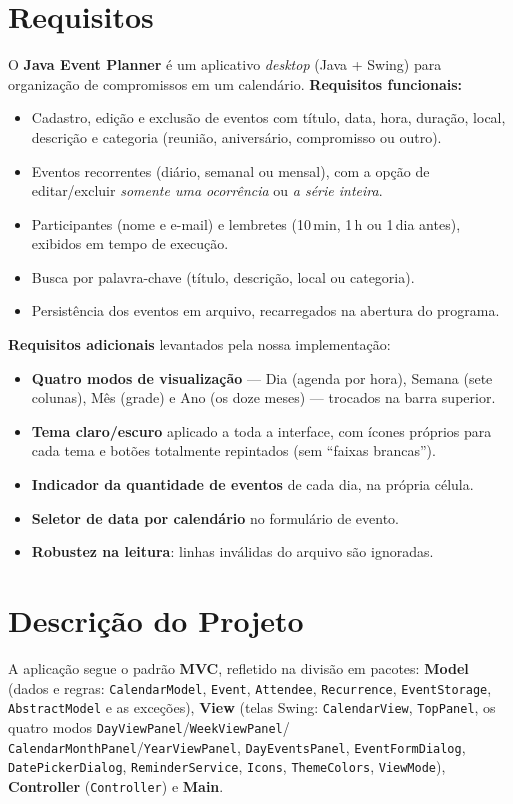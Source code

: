 \documentclass[10pt,a4paper]{article}
\begin{document}
\section{Requisitos}
O \textbf{Java Event Planner} é um aplicativo \emph{desktop} (Java + Swing) para
organização de compromissos em um calendário. \textbf{Requisitos funcionais:}
\begin{itemize}
  \item Cadastro, edição e exclusão de eventos com título, data, hora, duração,
        local, descrição e categoria (reunião, aniversário, compromisso ou outro).
  \item Eventos recorrentes (diário, semanal ou mensal), com a opção de
        editar/excluir \emph{somente uma ocorrência} ou \emph{a série inteira}.
  \item Participantes (nome e e-mail) e lembretes (10\,min, 1\,h ou 1\,dia antes),
        exibidos em tempo de execução.
  \item Busca por palavra-chave (título, descrição, local ou categoria).
  \item Persistência dos eventos em arquivo, recarregados na abertura do programa.
\end{itemize}
\textbf{Requisitos adicionais} levantados pela nossa implementação:
\begin{itemize}
  \item \textbf{Quatro modos de visualização} — Dia (agenda por hora), Semana (sete
        colunas), Mês (grade) e Ano (os doze meses) — trocados na barra superior.
  \item \textbf{Tema claro/escuro} aplicado a toda a interface, com ícones próprios
        para cada tema e botões totalmente repintados (sem ``faixas brancas'').
  \item \textbf{Indicador da quantidade de eventos} de cada dia, na própria célula.
  \item \textbf{Seletor de data por calendário} no formulário de evento.
  \item \textbf{Robustez na leitura}: linhas inválidas do arquivo são ignoradas.
\end{itemize}

\section{Descrição do Projeto}
A aplicação segue o padrão \textbf{MVC}, refletido na divisão em pacotes:
\textbf{Model} (dados e regras: \texttt{CalendarModel}, \texttt{Event},
\texttt{Attendee}, \texttt{Recurrence}, \texttt{EventStorage}, \texttt{AbstractModel}
e as exceções), \textbf{View} (telas Swing: \texttt{CalendarView},
\texttt{TopPanel}, os quatro modos \texttt{DayViewPanel}/\texttt{WeekViewPanel}/%
\texttt{CalendarMonthPanel}/\texttt{YearViewPanel}, \texttt{DayEventsPanel},
\texttt{EventFormDialog}, \texttt{DatePickerDialog}, \texttt{ReminderService},
\texttt{Icons}, \texttt{ThemeColors}, \texttt{ViewMode}), \textbf{Controller}
(\texttt{Controller}) e \textbf{Main}.
\end{document}
